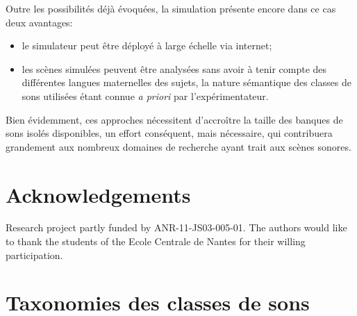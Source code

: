 \documentclass[twoside,twocolumn]{article}
\begin{document}
Outre les possibilités déjà évoquées, la simulation présente encore dans ce cas deux avantages:

\begin{itemize}
\item le simulateur peut être déployé à large échelle via internet;
\item les scènes simulées peuvent être analysées sans avoir à tenir compte des différentes langues maternelles des sujets, la nature sémantique des classes de sons utilisées étant connue \emph{a priori} par l'expérimentateur.
\end{itemize}

Bien évidemment, ces approches nécessitent d'accroître la taille des banques de sons isolés disponibles, un effort conséquent, mais nécessaire, qui contribuera grandement aux nombreux domaines de recherche ayant trait aux scènes sonores. 

\section*{\normalsize Acknowledgements}
\setlength{\parindent}{0.7cm} 
Research project partly funded by ANR-11-JS03-005-01. The authors would like to thank the students of the Ecole Centrale de Nantes for their willing participation.





\onecolumn

\appendix
\section{Taxonomies des classes de sons}
\label{app:taxonomie}
\end{document}
